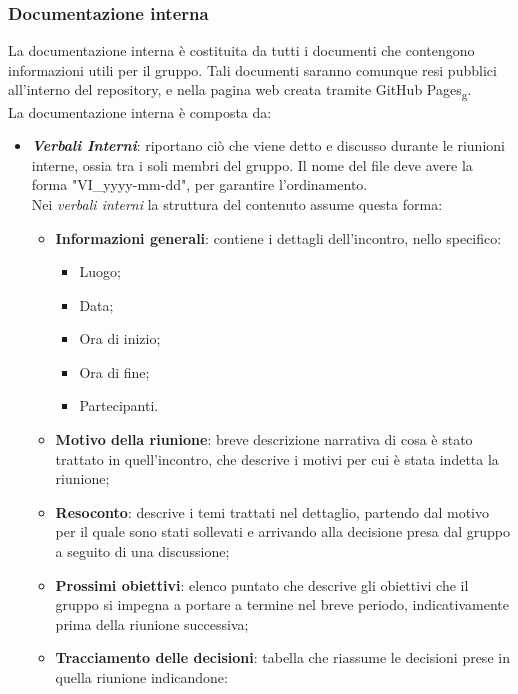 \subsubsection{Documentazione interna}
La documentazione interna è costituita da tutti i documenti che contengono
informazioni utili per il gruppo. Tali documenti saranno comunque resi pubblici
all'interno del repository, e nella pagina web creata tramite GitHub
Pages\textsubscript{g}.\\ La documentazione interna è composta da:
\begin{itemize}
      \item \textit{\textbf{Verbali Interni}}: riportano ciò che viene detto e discusso durante le riunioni interne, ossia tra i soli membri del gruppo.
            Il nome del file deve avere la forma "VI\_yyyy-mm-dd", per garantire l'ordinamento.
            \\Nei \textit{verbali interni} la struttura del contenuto assume questa forma:
            \begin{itemize}
                  \item \textbf{Informazioni generali}: contiene i dettagli dell'incontro, nello specifico:
                        \begin{itemize}
                              \item Luogo;
                              \item Data;
                              \item Ora di inizio;
                              \item Ora di fine;
                              \item Partecipanti.
                        \end{itemize}
                  \item \textbf{Motivo della riunione}: breve descrizione narrativa di cosa è stato trattato in quell'incontro, che descrive i motivi per cui è stata indetta la riunione;
                  \item \textbf{Resoconto}: descrive i temi trattati nel dettaglio, partendo dal motivo per il quale sono stati sollevati e arrivando alla decisione presa dal gruppo a seguito di una discussione;
                  \item \textbf{Prossimi obiettivi}: elenco puntato che descrive gli obiettivi che il gruppo si impegna a portare a termine nel breve periodo, indicativamente prima della riunione successiva;
                  \item \textbf{Tracciamento delle decisioni}: tabella che riassume le decisioni prese in quella riunione indicandone:

\end{itemize}
\end{itemize}
